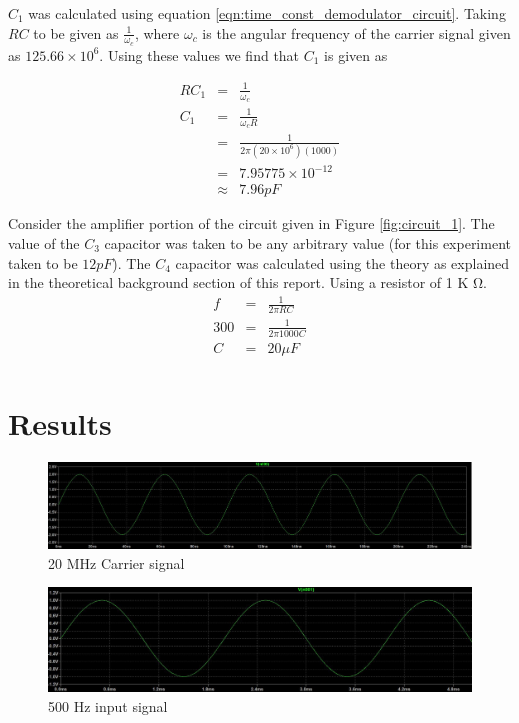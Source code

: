\documentclass[12pt, a4paper]{article}
\begin{document}
	$C_1$ was calculated using equation \ref{eqn:time_const_demodulator_circuit}. Taking $RC$ to be given as $\frac{1}{\omega_c}$, where $\omega_c$ is the angular frequency of the carrier signal given as $125.66 \times 10^6 $. Using these values we find that $C_1$ is given as

	\[
		\begin{array}{rcl}
			RC_1 & = & \frac{1}{\omega_c} \\
			C_1 & = & \frac{1}{\omega_c R} \\
			& = & \frac{1}{2\pi (20\times 10^6)(1000)} \\
			& = & 7.95775 \times 10^{-12} \\
			& \approx & 7.96 pF
		\end{array}
	\]

	Consider the amplifier portion of the circuit given in Figure \ref{fig:circuit_1}. The value of the $C_3$ capacitor was taken to be any arbitrary value (for this experiment taken to be $12 pF$). The $C_4$ capacitor was calculated using the theory as explained in the theoretical background section of this report. Using a resistor of 1 K \si{\ohm}. 
	\[
		\begin{array}{rcl}
			f &= & \frac{1}{2\pi RC} \\
			300 &=& \frac{1}{2\pi 1000C} \\
			C &=& 20 \mu F \\
		\end{array}
	\]





\section{Results} %
\label{sec:results}
	\begin{figure}[H]
		\centering
		\includegraphics[width=\textwidth]{images/carrier.JPG}
		\caption{20 MHz Carrier signal}
		\label{fig:carrier}
	\end{figure}

	\begin{figure}[H]
		\centering
		\includegraphics[width=\textwidth]{images/modulating.JPG}
		\caption{500 Hz input signal}
		\label{fig:modulating}
	\end{figure}
\end{document}
